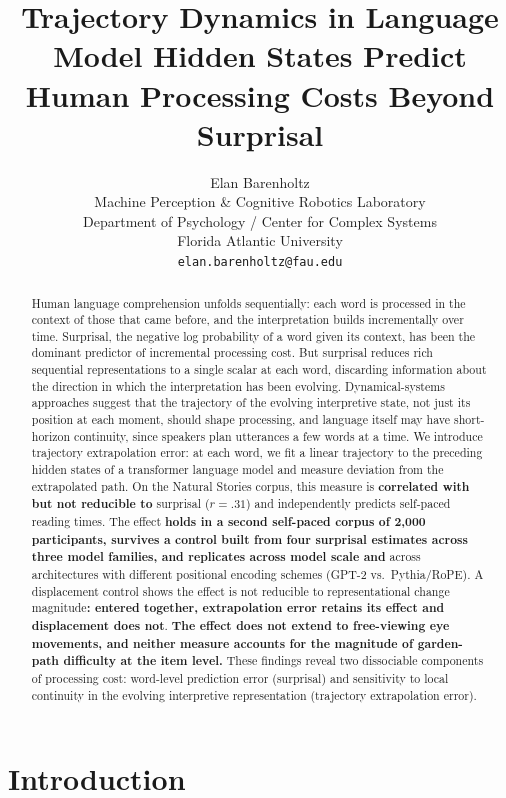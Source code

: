 \documentclass[12pt]{article}
\title{Trajectory Dynamics in Language Model Hidden States Predict Human Processing Costs Beyond Surprisal}
\author{Elan Barenholtz\\
Machine Perception \& Cognitive Robotics Laboratory\\
Department of Psychology / Center for Complex Systems\\
Florida Atlantic University\\
\texttt{elan.barenholtz@fau.edu}}
\date{}
\newcommand{\new}[1]{{\bfseries #1}}
\begin{document}
\maketitle

\begin{abstract}
Human language comprehension unfolds sequentially: each word is processed in the context of those that came before, and the interpretation builds incrementally over time. Surprisal, the negative log probability of a word given its context, has been the dominant predictor of incremental processing cost. But surprisal reduces rich sequential representations to a single scalar at each word, discarding information about the direction in which the interpretation has been evolving. Dynamical-systems approaches suggest that the trajectory of the evolving interpretive state, not just its position at each moment, should shape processing, and language itself may have short-horizon continuity, since speakers plan utterances a few words at a time. We introduce trajectory extrapolation error: at each word, we fit a linear trajectory to the preceding hidden states of a transformer language model and measure deviation from the extrapolated path. On the Natural Stories corpus, this measure is \new{correlated with but not reducible to} surprisal (\new{$r = .31$}) and independently predicts self-paced reading times. The effect \new{holds in a second self-paced corpus of 2,000 participants, survives a control built from four surprisal estimates across three model families, and replicates across model scale and} across architectures with different positional encoding schemes (GPT-2 vs.\ Pythia/RoPE). A displacement control shows the effect is not reducible to representational change magnitude\new{: entered together, extrapolation error retains its effect and displacement does not}. \new{The effect does not extend to free-viewing eye movements, and neither measure accounts for the magnitude of garden-path difficulty at the item level.} These findings reveal two dissociable components of processing cost: word-level prediction error (surprisal) and sensitivity to local continuity in the evolving interpretive representation (trajectory extrapolation error).

\end{abstract}

\newpage

\section{Introduction}
\end{document}
